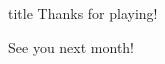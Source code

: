 \documentclass[11pt]{beamer}
\begin{document}
\subsection*{\ }
\begingroup{}
\begin{frame}
\vfill{}
\centering{}
\begin{beamercolorbox}[sep=8pt,center,shadow=true,rounded=true]{title}
Thanks for playing!\par%
See you next month!
\end{beamercolorbox}
\vfill{}
\end{frame}
\endgroup{}
\end{document}

